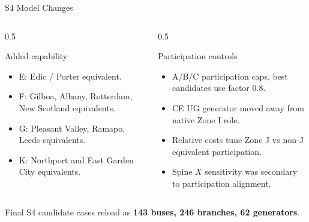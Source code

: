 \documentclass[aspectratio=169,10pt]{beamer}
\begin{document}
\begin{frame}{S4 Model Changes}
\begin{columns}[T,onlytextwidth]
\begin{column}{0.5\linewidth}
\begin{block}{Added capability}
\begin{itemize}
  \item E: Edic / Porter equivalent.
  \item F: Gilboa, Albany, Rotterdam, New Scotland equivalents.
  \item G: Pleasant Valley, Ramapo, Leeds equivalents.
  \item K: Northport and East Garden City equivalents.
\end{itemize}
\end{block}
\end{column}
\begin{column}{0.5\linewidth}
\begin{block}{Participation controls}
\begin{itemize}
  \item A/B/C participation caps, best candidates use factor 0.8.
  \item CE UG generator moved away from native Zone I role.
  \item Relative costs tune Zone J vs non-J equivalent participation.
  \item Spine $X$ sensitivity was secondary to participation alignment.
\end{itemize}
\end{block}
\end{column}
\end{columns}

\vspace{0.6em}
\begin{center}
\small Final S4 candidate cases reload as \textbf{143 buses, 246 branches, 62 generators}.
\end{center}
\end{frame}
\end{document}
